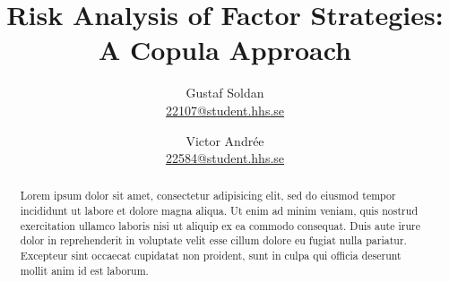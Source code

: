 
\begin{titlepage}
  \title{Risk Analysis of Factor Strategies:\\A Copula Approach}
  \author{
    Gustaf Soldan \\ \href{mailto:22107@student.hhs.se}{22107@student.hhs.se}\and
    Victor Andrée \\ \href{mailto:22584@student.hhs.se}{22584@student.hhs.se}
  }

  \maketitle

  \begin{abstract}
    \noindent Lorem ipsum dolor sit amet, consectetur adipisicing elit, sed do eiusmod
    tempor incididunt ut labore et dolore magna aliqua. Ut enim ad minim veniam,
    quis nostrud exercitation ullamco laboris nisi ut aliquip ex ea commodo
    consequat. Duis aute irure dolor in reprehenderit in voluptate velit esse
    cillum dolore eu fugiat nulla pariatur. Excepteur sint occaecat cupidatat non
    proident, sunt in culpa qui officia deserunt mollit anim id est laborum.
  \end{abstract}

  \thispagestyle{empty}
\end{titlepage}
